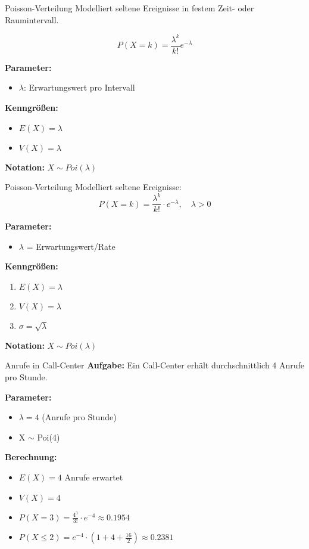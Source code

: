 \begin{definition}{Poisson-Verteilung}
Modelliert seltene Ereignisse in festem Zeit- oder Raumintervall.

$$P(X=k) = \frac{\lambda^k}{k!}e^{-\lambda}$$

\textbf{Parameter:}
\begin{itemize}
    \item $\lambda$: Erwartungswert pro Intervall
\end{itemize}

\textbf{Kenngrößen:}
\begin{itemize}
    \item $E(X) = \lambda$
    \item $V(X) = \lambda$
\end{itemize}

\textbf{Notation:} $X \sim Poi(\lambda)$
\end{definition}

\begin{definition}{Poisson-Verteilung}
Modelliert seltene Ereignisse:
$$P(X=k) = \frac{\lambda^k}{k!} \cdot e^{-\lambda}, \quad \lambda > 0$$

\textbf{Parameter:}
\begin{itemize}
    \item $\lambda$ = Erwartungswert/Rate
\end{itemize}

\textbf{Kenngrößen:}
\begin{enumerate}
    \item $E(X) = \lambda$
    \item $V(X) = \lambda$
    \item $\sigma = \sqrt{\lambda}$
\end{enumerate}

\textbf{Notation:} $X \sim Poi(\lambda)$
\end{definition}

\begin{example2}{Anrufe in Call-Center}
\textbf{Aufgabe:} Ein Call-Center erhält durchschnittlich 4 Anrufe pro Stunde.

\textbf{Parameter:}
\begin{itemize}
\item $\lambda = 4$ (Anrufe pro Stunde)
\item X $\sim$ Poi(4)
\end{itemize}

\textbf{Berechnung:}
\begin{itemize}
\item $E(X) = 4$ Anrufe erwartet
\item $V(X) = 4$
\item $P(X=3) = \frac{4^3}{3!} \cdot e^{-4} \approx 0.1954$
\item $P(X \leq 2) = e^{-4} \cdot (1 + 4 + \frac{16}{2}) \approx 0.2381$
\end{itemize}
\end{example2}

